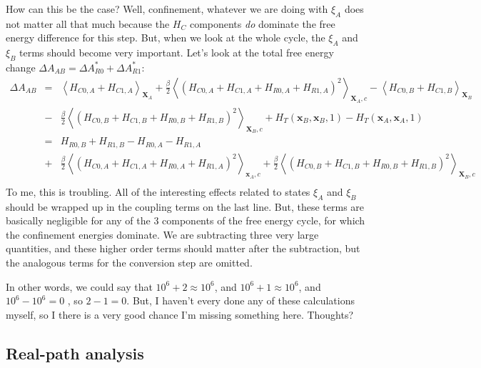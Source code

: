 \documentclass[%
 preprint,
 amsmath,amssymb,
 aps,
]{revtex4-1}
\renewcommand{\vec}[1]{{\bm{#1}}}
\begin{document}
 How can this be the case?  Well,  confinement, whatever we are doing with $\xi_A$ does not matter all that much because the $H_C$ components \emph{do} dominate the free energy difference for this step.  But, when we look at the whole cycle, the $\xi_A$ and $\xi_B$ terms should become very important.  Let's look at the total free energy change $\Delta A_{AB} = \Delta A^*_ {R0}+\Delta A^*_ {R1}$:
 \begin{eqnarray}
 \Delta A_{AB} &= &
 \left \langle H_{C0,A}+H_{C1,A} \right \rangle_{\vec{X}_A} +  \frac{\beta}{2}\left \langle \left( H_{C0,A}+H_{C1,A}+H_{R0,A}+H_{R1,A} \right)^2 \right \rangle_{\vec{X}_A,c}
 - \left \langle H_{C0,B}+H_{C1,B} \right \rangle_{\vec{X}_B} 
 \nonumber \\ 
 & -& \frac{\beta}{2}\left \langle \left( H_{C0,B}+H_{C1,B} + H_{R0,B}+H_{R1,B} \right)^2 \right \rangle_{\vec{X}_B,c}
 +H_T \left( \vec{x}_B,\vec{x}_B,1 \right) -  H_T \left( \vec{x}_A,\vec{x}_A,1 \right) 
 \nonumber  \\ & = & 
  H_{R0,B}+H_{R1,B}-H_{R0,A}-H_{R1,A}
   \nonumber \\
 & + & 
 \frac{\beta}{2}\left \langle \left( H_{C0,A}+H_{C1,A} +H_{R0,A}+H_{R1,A} \right)^2 \right\rangle_{\vec{x}_A,c}  +  \frac{\beta}{2}\left \langle \left( H_{C0,B}+H_{C1,B} + H_{R0,B}+H_{R1,B}  \right)^2 \right \rangle_{\vec{X}_B,c}
 \nonumber \\
 \label{e:CCRtot}
 \end{eqnarray}
 To me, this is troubling.  All of the interesting effects related to states $\xi_A$ and $\xi_B$ should be wrapped up in the coupling terms on the last line.  But, these terms are basically negligible for any of the 3 components of the free energy cycle, for which the confinement energies dominate.  We are subtracting three very large quantities, and these higher order terms should matter after the subtraction, but the analogous terms for the conversion step are omitted.  
 
 In other words, we could say that $10^6+2 \approx 10^6$, and $10^6+1 \approx 10^6$, and $10^6 - 10^6 =0$ , so $2-1=0$.  
 But, I haven't every done any of these calculations myself, so I there is a very good chance I'm missing something here.  Thoughts? 
 
 
 \subsection{Real-path analysis}
 
\end{document}
